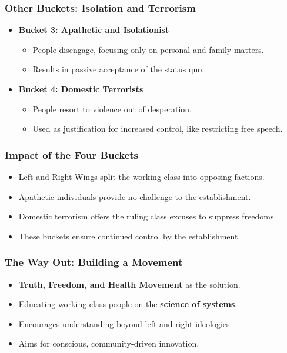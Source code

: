 \begin{frame}[fragile]\frametitle{Other Buckets: Isolation and Terrorism}
      \begin{itemize}
        \item \textbf{Bucket 3: Apathetic and Isolationist}
        \begin{itemize}
            \item People disengage, focusing only on personal and family matters.
            \item Results in passive acceptance of the status quo.
        \end{itemize}
        \item \textbf{Bucket 4: Domestic Terrorists}
        \begin{itemize}
            \item People resort to violence out of desperation.
            \item Used as justification for increased control, like restricting free speech.
        \end{itemize}
      \end{itemize}
\end{frame}

\begin{frame}[fragile]\frametitle{Impact of the Four Buckets}
      \begin{itemize}
        \item Left and Right Wings split the working class into opposing factions.
        \item Apathetic individuals provide no challenge to the establishment.
        \item Domestic terrorism offers the ruling class excuses to suppress freedoms.
        \item These buckets ensure continued control by the establishment.
      \end{itemize}
\end{frame}

\begin{frame}[fragile]\frametitle{The Way Out: Building a Movement}
      \begin{itemize}
        \item \textbf{Truth, Freedom, and Health Movement} as the solution.
        \item Educating working-class people on the \textbf{science of systems}.
        \item Encourages understanding beyond left and right ideologies.
        \item Aims for conscious, community-driven innovation.
      \end{itemize}
\end{frame}

